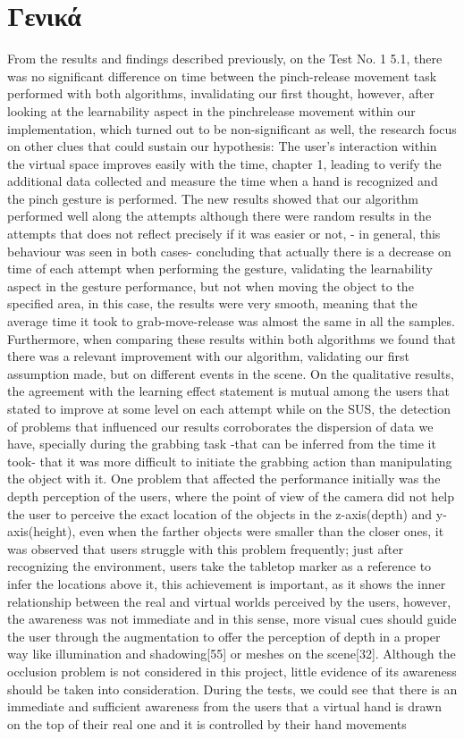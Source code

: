 \section{Γενικά}
From the results and findings described previously, on the Test No. 1 5.1, there was no significant difference on time between the pinch-release movement task performed with both algorithms, invalidating our first thought, however, after looking at the learnability aspect in the pinchrelease movement within our implementation, which turned out to be non-significant as well, the research focus on other clues that could sustain our hypothesis: The user’s interaction within the virtual space improves easily with the time, chapter 1, leading to verify the additional data collected and measure the time when a hand is recognized and the pinch gesture is performed. The new results showed that our algorithm performed well along the attempts although there were random results in the attempts that does not reflect precisely if it was easier or not, - in general, this behaviour was seen in both cases- concluding that actually there is a decrease on time of each attempt when performing the gesture, validating the learnability aspect in the gesture performance, but not when moving the object to the specified area, in this case, the results were very smooth, meaning that the average time it took to grab-move-release was almost the same in all the samples. Furthermore, when comparing these results within both algorithms we found that there was a relevant improvement with our algorithm, validating our first assumption made, but on different events in the scene. On the qualitative results, the agreement with the learning effect statement is mutual among the users that stated to improve at some level on each attempt while on the SUS, the detection of problems that influenced our results corroborates the dispersion of data we have, specially during the grabbing task -that can be inferred from the time it took- that it was more difficult to initiate the grabbing action than manipulating the object with it. One problem that affected the performance initially was the depth perception of the users, where the point of view of the camera did not help the user to perceive the exact location of the objects in the z-axis(depth) and y-axis(height), even when the farther objects were smaller than the closer ones, it was observed that users struggle with this problem frequently; just after recognizing the environment, users take the tabletop marker as a reference to infer the locations above it, this achievement is important, as it shows the inner relationship between the real and virtual worlds perceived by the users, however, the awareness was not immediate and in this sense, more visual cues should guide the user through the augmentation to offer the perception of depth in a proper way like illumination and shadowing[55] or meshes on the scene[32]. Although the occlusion problem is not considered in this project, little evidence of its awareness should be taken into consideration. During the tests, we could see that there is an immediate and sufficient awareness from the users that a virtual hand is drawn on the top of their real one and it is controlled by their hand movements 